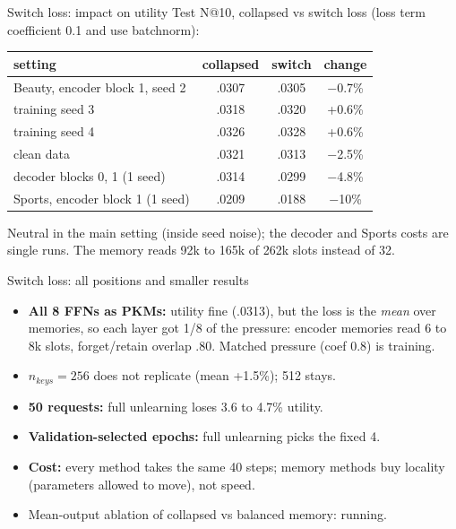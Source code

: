 \documentclass{beamer}
\begin{document}
\begin{frame}{Switch loss: impact on utility}
Test N@10, collapsed vs switch loss (loss term coefficient 0.1 and use batchnorm):
\begin{center}
\footnotesize\setlength{\tabcolsep}{4pt}
\begin{tabular}{|l|c|c|c|}
\hline
setting & collapsed & switch & change \\
\hline
Beauty, encoder block 1, seed 2 & .0307 & .0305 & $-$0.7\% \\
training seed 3                 & .0318 & .0320 & +0.6\% \\
training seed 4                 & .0326 & .0328 & +0.6\% \\
clean data                      & .0321 & .0313 & $-$2.5\% \\
decoder blocks 0, 1 (1 seed)    & .0314 & .0299 & $-$4.8\% \\
Sports, encoder block 1 (1 seed) & .0209 & .0188 & $-$10\% \\
\hline
\end{tabular}
\end{center}
Neutral in the main setting (inside seed noise); the decoder and Sports costs
are single runs. The memory reads 92k to 165k of 262k slots instead of 32.
\end{frame}

\begin{frame}{Switch loss: all positions and smaller results}
\begin{itemize}
  \item \textbf{All 8 FFNs as PKMs:} utility fine (.0313), but the loss is the
        \emph{mean} over memories, so each layer got 1/8 of the pressure:
        encoder memories read 6 to 8k slots, forget/retain overlap .80.
        Matched pressure (coef 0.8) is training.
  \item $n_{keys}=256$ does not replicate (mean +1.5\%); 512 stays.
  \item \textbf{50 requests:} full unlearning loses 3.6 to 4.7\% utility.
  \item \textbf{Validation-selected epochs:} full unlearning picks the fixed 4.
  \item \textbf{Cost:} every method takes the same 40 steps; memory methods buy
        locality (parameters allowed to move), not speed.
  \item Mean-output ablation of collapsed vs balanced memory: running.
\end{itemize}
\end{frame}
\end{document}
